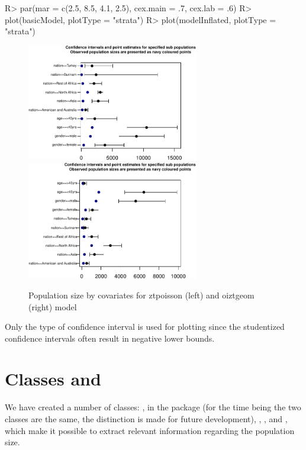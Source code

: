\documentclass[nojss]{jss}
\newcommand{\1}{\mathcal{I}} \newcommand{\bZero}{\boldsymbol{0}}
\begin{document}
\begin{CodeChunk}
\begin{CodeInput}
R> par(mar = c(2.5, 8.5, 4.1, 2.5), cex.main = .7, cex.lab = .6)
R> plot(basicModel, plotType = "strata")
R> plot(modelInflated, plotType = "strata")
\end{CodeInput}
\begin{figure}[ht]

{\centering \includegraphics[width=7.5cm]{singleRcapture_files/figure-latex/strata_plot-1} \includegraphics[width=7.5cm]{singleRcapture_files/figure-latex/strata_plot-2}

}

\caption[Population size by covariates for ztpoisson (left) and oiztgeom (right) model]{Population size by covariates for ztpoisson (left) and oiztgeom (right) model}\label{fig:strata_plot}
\end{figure}
\end{CodeChunk}

Only the  type of confidence interval is used for
plotting since the studentized confidence intervals often result in
negative lower bounds.

\section[Classes and S3Methods]{Classes and }\label{sec-methods}

We have created a number of classes: ,
 in the package (for the time being the two classes are
the same, the distinction is made for future development),
, ,
 and ,
which make it possible to extract relevant information regarding the
population size.
\end{document}
